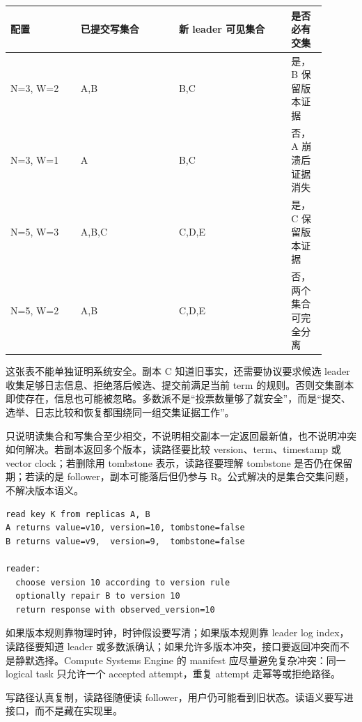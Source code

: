 \begin{center}
\small
\begin{tabular}{@{}p{0.20\linewidth}p{0.28\linewidth}p{0.32\linewidth}p{0.10\linewidth}@{}}
\toprule
配置 & 已提交写集合 & 新 leader 可见集合 & 是否必有交集 \\
\midrule
N=3, W=2 & A,B & B,C & 是，B 保留版本证据 \\
N=3, W=1 & A & B,C & 否，A 崩溃后证据消失 \\
N=5, W=3 & A,B,C & C,D,E & 是，C 保留版本证据 \\
N=5, W=2 & A,B & C,D,E & 否，两个集合可完全分离 \\
\bottomrule
\end{tabular}
\end{center}

这张表不能单独证明系统安全。副本 C 知道旧事实，还需要协议要求候选 leader 收集足够日志信息、拒绝落后候选、提交前满足当前 term 的规则。否则交集副本即使存在，信息也可能被忽略。多数派不是“投票数量够了就安全”，而是“提交、选举、日志比较和恢复都围绕同一组交集证据工作”。

 只说明读集合和写集合至少相交，不说明相交副本一定返回最新值，也不说明冲突如何解决。若副本返回多个版本，读路径要比较 version、term、timestamp 或 vector clock；若删除用 tombstone 表示，读路径要理解 tombstone 是否仍在保留期；若读的是 follower，副本可能落后但仍参与 R。公式解决的是集合交集问题，不解决版本语义。

\begin{lstlisting}[numbers=none,caption={一次 quorum read 还要处理版本比较}]
read key K from replicas A, B
A returns value=v10, version=10, tombstone=false
B returns value=v9,  version=9,  tombstone=false

reader:
  choose version 10 according to version rule
  optionally repair B to version 10
  return response with observed_version=10
\end{lstlisting}

如果版本规则靠物理时钟，时钟假设要写清；如果版本规则靠 leader log index，读路径要知道 leader 或多数派确认；如果允许多版本冲突，接口要返回冲突而不是静默选择。Compute Systems Engine 的 manifest 应尽量避免复杂冲突：同一 logical task 只允许一个 accepted attempt，重复 attempt 走幂等或拒绝路径。

写路径认真复制，读路径随便读 follower，用户仍可能看到旧状态。读语义要写进接口，而不是藏在实现里。

